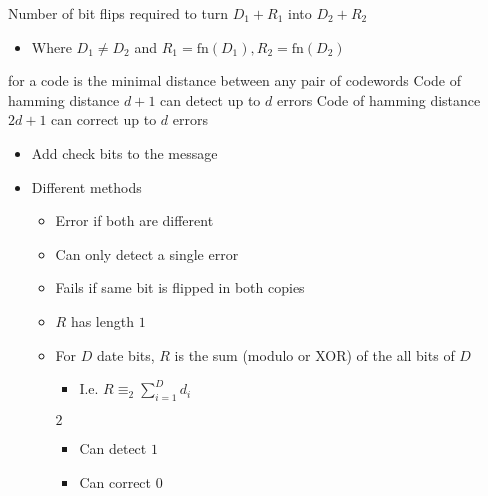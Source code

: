 \begin{itemize}
\begin{itemize}
        \end{itemize}
        \begin{itemize}
             Number of bit flips required to turn $D_1 + R_1$ into $D_2 + R_2$
                \begin{itemize}
                    \item Where $D_1 \neq D_2$ and $R_1 = \text{fn}(D_1), R_2 = \text{fn}(D_2)$
                \end{itemize}
             for a code is the minimal distance between any pair of codewords
             Code of hamming distance $d + 1$ can detect up to $d$ errors
             Code of hamming distance $2d + 1$ can correct up to $d$ errors
        \end{itemize}
        \begin{itemize}
            \item Add check bits to the message
            \item Different methods
                \begin{itemize}
                     Send each message twice
                    \item Error if both are different
                    \item Can only detect a single error
                    \item Fails if same bit is flipped in both copies
                \end{itemize}
                \begin{itemize}
                    \item $R$ has length $1$
                    \item For $D$ date bits, $R$ is the sum (modulo or XOR) of the all bits of $D$
                        \begin{itemize}
                            \item I.e. $R \equiv_2 \sum_{i=1}^{D} d_i$
                        \end{itemize}
                     $2$
                        \begin{itemize}
                            \item Can detect $1$
                            \item Can correct $0$
                        \end{itemize}

\end{itemize}
\end{itemize}
\end{itemize}
